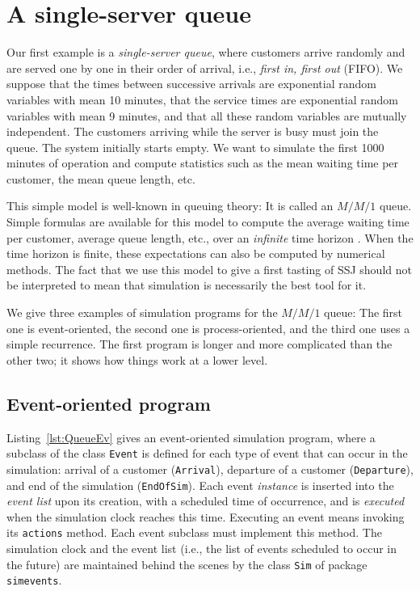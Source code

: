 \section {A single-server queue}
\label {sec:queue}

Our first example is a {\em single-server queue}, where customers
arrive randomly and are served one by one in their order of arrival,
i.e., {\em first in, first out\/} (FIFO).
We suppose that the times between successive arrivals are exponential
random variables with mean 10 minutes, that the service times are exponential
random variables with mean 9 minutes, and that all these random variables are 
mutually independent.
The customers arriving while the server is busy must join the queue.
The system initially starts empty.  We want to simulate the first 1000
minutes of operation and compute statistics such as the mean waiting time
per customer, the mean queue length, etc.

This simple model is well-known in queuing theory: It is called
an $M/M/1$ queue.  Simple formulas are available for this model to
compute the average waiting time per customer, average queue length,
etc., over an {\em infinite\/} time horizon \cite{pKLE75a}.
When the time horizon is finite, these expectations can also
be computed by numerical methods.  The fact that we use this model 
to give a first tasting of SSJ should not be interpreted to mean that 
simulation is necessarily the best tool for it.

We give three examples of simulation programs for the $M/M/1$ queue:
The first one is event-oriented, the second one is process-oriented,
and the third one uses a simple recurrence.
The first program is longer and more complicated than the other two;
it shows how things work at a lower level.


\subsection {Event-oriented program}



Listing~\ref{lst:QueueEv} gives an event-oriented simulation program,
where a subclass of the class \texttt{Event} is defined for each type
of event that can occur in the simulation:
arrival of a customer (\texttt{Arrival}),
departure of a customer (\texttt{Departure}),
and end of the simulation (\texttt{EndOfSim}).
Each event {\em instance\/} is inserted into the {\em event list\/}
upon its creation, with a scheduled time of occurrence, and is
{\em executed\/} when the simulation clock reaches this time.
Executing an event means invoking its \texttt{actions} method.
Each event subclass must implement this method.
The simulation clock and the event list (i.e., the list of events 
scheduled to occur in the future) are maintained behind the
scenes by the class \texttt{Sim} of package \texttt{simevents}.

